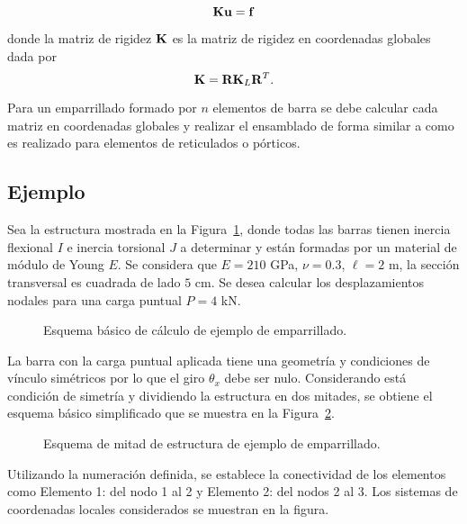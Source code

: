 \begin{equation}
{\bf K} {\bf u} = {\bf f}
\end{equation}

donde la matriz de rigidez ${\bf K}$ es la matriz de rigidez en coordenadas globales dada por
\begin{equation}\label{eqn:matrigtfglo}
{\bf K} = {\bf R} {\bf K}_L {\bf R}^T.
\end{equation}

Para un emparrillado formado por $n$ elementos de barra se debe calcular cada matriz en coordenadas globales y realizar el ensamblado de forma similar a como es realizado para elementos de reticulados o pórticos. %
%

\subsection{Ejemplo}

Sea la estructura mostrada en la Figura~\ref{fig:UT5_ejemplo}, donde todas las barras tienen inercia flexional $I$ e inercia torsional $J$ a determinar y están formadas por un material de módulo de Young $E$. %
Se considera que $E=210$ GPa, $\nu=0.3$, $\ell=2 $ m, la sección transversal es cuadrada de lado $5$ cm. %
%
Se desea calcular los desplazamientos nodales para una carga puntual $P=4 $ kN.

\begin{figure}[htb]
	\centering
	\def\svgwidth{0.6\textwidth}
	
	\caption{Esquema básico de cálculo de ejemplo de emparrillado.}
	\label{fig:UT5_ejemplo}
\end{figure}

La barra con la carga puntual aplicada tiene una geometría y condiciones de vínculo simétricos por lo que el giro $\theta_x$ debe ser nulo.
%
Considerando está condición de simetría  y dividiendo la estructura en dos mitades, se obtiene el esquema básico simplificado que se muestra en la Figura~\ref{fig:UT5_ejemplo2}.

\begin{figure}[htb]
	\centering
	\def\svgwidth{0.7\textwidth}
	
	\caption{Esquema de mitad de estructura de ejemplo de emparrillado.}
	\label{fig:UT5_ejemplo2}
\end{figure}

Utilizando la numeración definida, se establece la conectividad de los elementos como Elemento 1: del nodo 1 al 2 y Elemento 2: del nodos 2 al 3. %
Los sistemas de coordenadas locales considerados se muestran en la figura.

